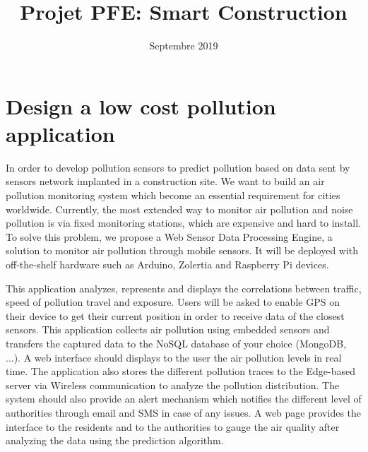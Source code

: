 \documentclass[a4papert]{article}
\title{\textbf{Projet PFE:} Smart Construction}
\date{Septembre 2019}
\begin{document}
\maketitle



\section{Design a low cost pollution application}

In order to develop pollution sensors to predict pollution based on data sent by sensors network implanted in a construction site\cite{alvear_architecture_2016,rosmiati_air_2019}.
We want to build an air pollution monitoring system which become an essential requirement for cities worldwide.
Currently,
	the most extended way to monitor air pollution and noise pollution is via fixed monitoring stations\cite{paredes-parra_alternative_2019},
	which are expensive and hard to install.
To solve this problem,
	we propose a Web Sensor Data Processing Engine,
	a solution to monitor air pollution through mobile sensors.
It will be deployed with off-the-shelf hardware such as Arduino, Zolertia and Raspberry Pi devices.

This application analyzes,
	represents and displays the correlations between traffic,
	speed of pollution travel and exposure.
Users will be asked to enable GPS on their device to get their current position in order to receive data of the closest sensors.
This application collects air pollution using embedded sensors and transfers the captured data to the NoSQL database of your choice (MongoDB, ...).
A web interface should displays to the user the air pollution levels in real time.
The application also stores the different pollution traces to the Edge-based server via Wireless communication to analyze the pollution distribution.
The system should also provide an alert mechanism which notifies the different level of authorities through email and SMS in case of any issues.
A web page provides the interface to the residents and to the authorities to gauge the air quality after analyzing the data using the prediction algorithm.
\end{document}
